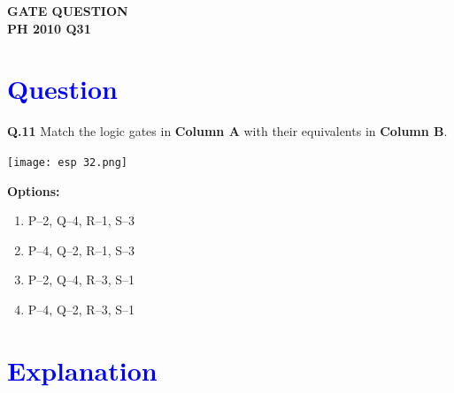 \documentclass[a4paper,12pt]{article}
\begin{document}
\pagestyle{empty} %

\thispagestyle{fancy} %
\fancyhf{} %
\renewcommand{\headrulewidth}{0pt} %



\vspace{1.5cm}
\begin{center}
    {\LARGE \textbf{\textcolor{darkskyblue}{GATE QUESTION\\PH 2010 Q31}}}
\end{center}

\vspace{0.5cm}
\section*{\textcolor{blue}{Question}}

\noindent\textbf{Q.11} Match the logic gates in \textbf{Column A} with their equivalents in \textbf{Column B}.
\vspace{1em}

\begin{center}
    \texttt{[image: esp 32.png]} %
\end{center}

\vspace{1em}

\noindent\textbf{Options:}
\begin{enumerate}[label=\textbf{\Alph*.}]
  \item P–2, Q–4, R–1, S–3
  \item P–4, Q–2, R–1, S–3
  \item P–2, Q–4, R–3, S–1
  \item P–4, Q–2, R–3, S–1
\end{enumerate}

\vspace{1em}
\section*{\textcolor{blue}{Explanation}}
\end{document}
